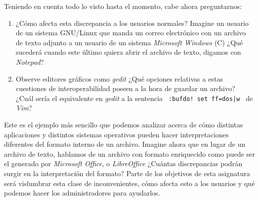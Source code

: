 \documentclass[12pt]{article}
\begin{document}
Teniendo en cuenta todo lo visto hasta el momento, cabe ahora preguntarnos: 

\begin{enumerate}[resume]

    \item ¿Cómo afecta esta discrepancia a los usuarios normales? Imagine un
    usuario de un sistema GNU/Linux que manda un correo electrónico con un
    archivo de texto adjunto a un usuario de un sistema \emph{Microsoft
    Windows} (C) ¿Qué sucederá cuando este último quiera abrir el archivo de
    texto, digamos con \emph{Notepad}?

    \item Observe editores gráficos como \emph{gedit} ¿Qué opciones relativas
    a estas cuestiones de interoperabilidad poseen a la hora de guardar un
    archivo? ¿Cuál sería el equivalente en  \emph{gedit} a la sentencia {\tt
    :bufdo! set ff=dos|w } de \emph{Vim}? 

\end{enumerate}
     
Este es el ejemplo más sencillo que podemos analizar acerca de cómo distintas
aplicaciones y distintos sistemas operativos pueden hacer interpretaciones
diferentes del formato interno de un archivo. Imagine ahora que en lugar de un
archivo de texto, hablamos de un archivo con formato enriquecido como puede
ser el generado por \emph{Microsoft Office}, o \emph{LibreOffice} ¿Cuántas
discrepancias podrán surgir en la interpretación del formato? Parte de los
objetivos de esta asignatura será vislumbrar esta clase de inconvenientes,
cómo afecta esto a los usuarios y qué podemos hacer los administradores para
ayudarlos. 
\end{document}
